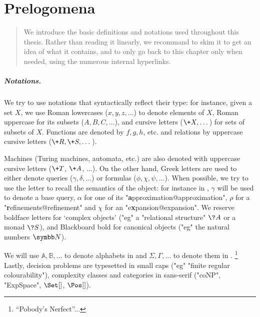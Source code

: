 \chapter{Prelogomena}
\label{ch:general-preliminaries}

\begin{chapterpresentation}
	\begin{abstract}
		We introduce the basic definitions and notations used throughout this thesis.
		Rather than reading it linearly, we recommand to skim it
		to get an idea of what it contains, and to only go back to this chapter
		only when needed, using the numerous internal hyperlinks.
	\end{abstract}
		
	\par\bigskip\bigskip
	\chaptertoc
\end{chapterpresentation}

\paragraph*{Notations.}
We try to use notations that syntactically reflect their type:
for instance, given a set $X$, we use Roman lowercases ($x,y,z,\dotsc$)
to denote elements of $X$, Roman uppercase for its subsets ($A, B, C, \dotsc$),
and cursive letters ($\+X, \dotsc$) for sets of subsets of $X$.
Functions are denoted by $f, g, h$, etc. and relations by
uppercase cursive letters ($\+R, \+S, \dotsc$).

Machines (Turing machines, automata, etc.) are also denoted
with uppercase cursive letters ($\+T$, $\+A$, $\dotsc$).
On the other hand, Greek letters are used to either denote queries ($\gamma, \delta, \dotsc$)
or formulas ($\phi, \chi, \psi, \dotsc$). When possible, we try to
use the letter to recall the semantics of the object: for instance in
, $\gamma$ will be used to denote a base query,
$\alpha$ for one of its "\textbf{a}pproximation@approximation",
$\rho$ for a "\textbf{r}efinements@refinement" and
$\chi$ for an "e\textbf{x}pansion@expansion".
We reserve boldface letters for `complex objects' ("eg"
a "relational structure" $\?A$ or a monad $\?S$), and Blackboard bold
for canonical objects ("eg" the natural numbers $\N$).

We will use $\mathbb{A}, \mathbb{B}, \dotsc$ to denote
alphabets in  and $\Sigma, \Gamma, \dotsc$
to denote them in .
\footnote{``Pobody's Nerfect''...}
Lastly, decision problems are typesetted in small caps
("eg" "finite regular colourability"), 
complexity classes and categories in sans-serif ("coNP", "ExpSpace", $\Set[]$,
$\Pos[]$).


